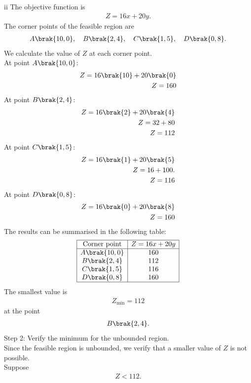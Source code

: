 \begin{enumerate}[label=\thesubsection.\arabic*, ref=\thesubsection.\theenumi]
{ii}
The objective function is
\begin{align}
Z=16x+20y.
\end{align}
The corner points of the feasible region are
\begin{align}
A\brak{10,0},\quad B\brak{2,4},\quad C\brak{1,5},\quad D\brak{0,8}.
\end{align}
We calculate the value of $Z$ at each corner point.
\\{At point $A\brak{10,0}$:}
\begin{align}
Z=16\brak{10}+20\brak{0}\\
Z=160
\end{align}
{At point $B\brak{2,4}$:}
\begin{align}
Z=16\brak{2}+20\brak{4}\\
Z=32+80\\
Z=112
\end{align}
{At point $C\brak{1,5}$:}
\begin{align}
Z=16\brak{1}+20\brak{5}\\
Z=16+100.\\
Z=116
\end{align}
{At point $D\brak{0,8}$:}
\begin{align}
Z=16\brak{0}+20\brak{8}\\
Z=160
\end{align}
The results can be summarised in the following table:
\begin{align}
\begin{array}{|c|c|}
\hline
\text{Corner point} & Z=16x+20y\\
\hline
A\brak{10,0} & 160\\
B\brak{2,4} & 112\\
C\brak{1,5} & 116\\
D\brak{0,8} & 160\\
\hline
\end{array}
\end{align}
The smallest value is
\begin{align}
Z_{\min}=112
\end{align}
at the point
\begin{align}
B\brak{2,4}.
\end{align}
{Step 2: Verify the minimum for the unbounded region.}
\\Since the feasible region is unbounded, we verify that a smaller
value of $Z$ is not possible.
\\Suppose
\begin{align}
Z<112.
\end{align}

\end{enumerate}
